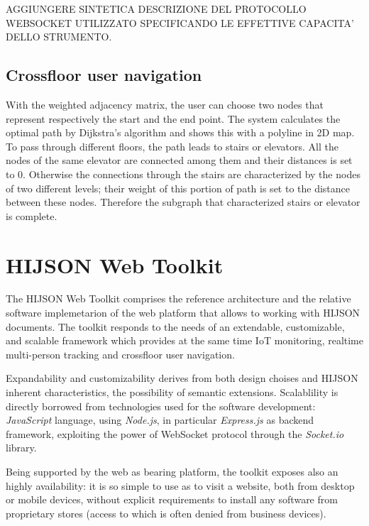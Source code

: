 \documentclass[]{article}
\begin{document}
AGGIUNGERE SINTETICA DESCRIZIONE DEL PROTOCOLLO WEBSOCKET UTILIZZATO
SPECIFICANDO LE EFFETTIVE CAPACITA' DELLO STRUMENTO.

\subsection{Crossfloor user
navigation}\label{crossfloor-user-navigation}

With the weighted adjacency matrix, the user can choose two nodes that
represent respectively the start and the end point. The system
calculates the optimal path by Dijkstra's algorithm and shows this with
a polyline in 2D map. To pass through different floors, the path leads
to stairs or elevators. All the nodes of the same elevator are connected
among them and their distances is set to 0. Otherwise the connections
through the stairs are characterized by the nodes of two different
levels; their weight of this portion of path is set to the distance
between these nodes. Therefore the subgraph that characterized stairs or
elevator is complete.

\section{HIJSON Web Toolkit}\label{hijson-web-toolkit}

The HIJSON Web Toolkit comprises the reference architecture and the
relative software implemetarion of the web platform that allows to
working with HIJSON documents. The toolkit responds to the needs of an
extendable, customizable, and scalable framework which provides at the
same time IoT monitoring, realtime multi-person tracking and crossfloor
user navigation.

Expandability and customizability derives from both design choises and
HIJSON inherent characteristics, the possibility of semantic extensions.
Scalablility is directly borrowed from technologies used for the
software development: \emph{JavaScript} language, using \emph{Node.js},
in particular \emph{Express.js} as backend framework, exploiting the
power of WebSocket protocol through the \emph{Socket.io} library.

Being supported by the web as bearing platform, the toolkit exposes also
an highly availability: it is so simple to use as to visit a website,
both from desktop or mobile devices, without explicit requirements to
install any software from proprietary stores (access to which is often
denied from business devices).
\end{document}
